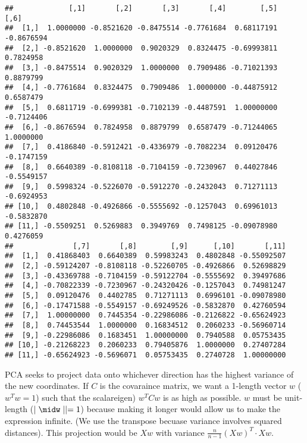 \documentclass[
]{article}
\newenvironment{Shaded}{\begin{snugshade}}{\end{snugshade}}
\newcommand{\KeywordTok}[1]{\textcolor[rgb]{0.13,0.29,0.53}{\textbf{#1}}}
\newcommand{\NormalTok}[1]{#1}
\newcommand{\OperatorTok}[1]{\textcolor[rgb]{0.81,0.36,0.00}{\textbf{#1}}}
\newcommand{\StringTok}[1]{\textcolor[rgb]{0.31,0.60,0.02}{#1}}
\begin{document}
\begin{Shaded}
\end{Shaded}

\begin{verbatim}
##             [,1]       [,2]       [,3]       [,4]        [,5]       [,6]
##  [1,]  1.0000000 -0.8521620 -0.8475514 -0.7761684  0.68117191 -0.8676594
##  [2,] -0.8521620  1.0000000  0.9020329  0.8324475 -0.69993811  0.7824958
##  [3,] -0.8475514  0.9020329  1.0000000  0.7909486 -0.71021393  0.8879799
##  [4,] -0.7761684  0.8324475  0.7909486  1.0000000 -0.44875912  0.6587479
##  [5,]  0.6811719 -0.6999381 -0.7102139 -0.4487591  1.00000000 -0.7124406
##  [6,] -0.8676594  0.7824958  0.8879799  0.6587479 -0.71244065  1.0000000
##  [7,]  0.4186840 -0.5912421 -0.4336979 -0.7082234  0.09120476 -0.1747159
##  [8,]  0.6640389 -0.8108118 -0.7104159 -0.7230967  0.44027846 -0.5549157
##  [9,]  0.5998324 -0.5226070 -0.5912270 -0.2432043  0.71271113 -0.6924953
## [10,]  0.4802848 -0.4926866 -0.5555692 -0.1257043  0.69961013 -0.5832870
## [11,] -0.5509251  0.5269883  0.3949769  0.7498125 -0.09078980  0.4276059
##              [,7]       [,8]        [,9]      [,10]       [,11]
##  [1,]  0.41868403  0.6640389  0.59983243  0.4802848 -0.55092507
##  [2,] -0.59124207 -0.8108118 -0.52260705 -0.4926866  0.52698829
##  [3,] -0.43369788 -0.7104159 -0.59122704 -0.5555692  0.39497686
##  [4,] -0.70822339 -0.7230967 -0.24320426 -0.1257043  0.74981247
##  [5,]  0.09120476  0.4402785  0.71271113  0.6996101 -0.09078980
##  [6,] -0.17471588 -0.5549157 -0.69249526 -0.5832870  0.42760594
##  [7,]  1.00000000  0.7445354 -0.22986086 -0.2126822 -0.65624923
##  [8,]  0.74453544  1.0000000  0.16834512  0.2060233 -0.56960714
##  [9,] -0.22986086  0.1683451  1.00000000  0.7940588  0.05753435
## [10,] -0.21268223  0.2060233  0.79405876  1.0000000  0.27407284
## [11,] -0.65624923 -0.5696071  0.05753435  0.2740728  1.00000000
\end{verbatim}

PCA seeks to project data onto whichever direction has the highest
variance of the new coordinates. If \(C\) is the covaraince matrix, we
want a 1-length vector \(w\) (\(w^Tw=1\)) such that the scalareigen)
\(w^TCw\) is as high as possible. \(w\) must be unit-length
(\(\mid\midw\mid\mid=1\)) because making it longer would allow us to
make the expression infinite. (We use the transpose becuase variance
involves squared distances). This projection would be \(Xw\) with
variance \(\frac{n}{n-1}(Xw)^T\cdot{Xw}\).
\end{document}
